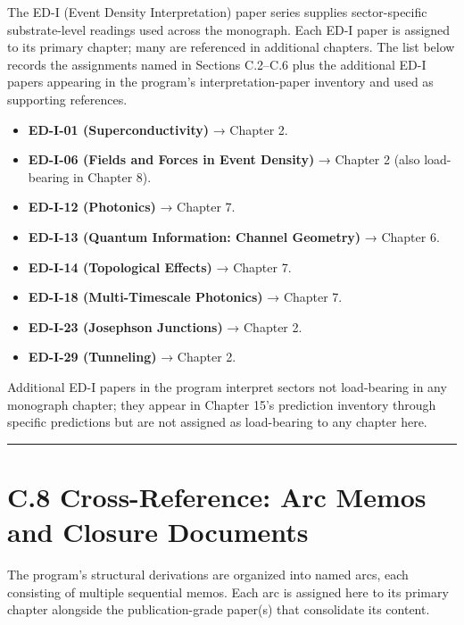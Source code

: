 \documentclass[11pt]{book}
\begin{document}
The ED-I (Event Density Interpretation) paper series supplies sector-specific substrate-level readings used across the monograph. Each ED-I paper is assigned to its primary chapter; many are referenced in additional chapters. The list below records the assignments named in Sections C.2–C.6 plus the additional ED-I papers appearing in the program's interpretation-paper inventory and used as supporting references.

\begin{itemize}
\item \textbf{ED-I-01 (Superconductivity)} → Chapter 2.
\item \textbf{ED-I-06 (Fields and Forces in Event Density)} → Chapter 2 (also load-bearing in Chapter 8).
\item \textbf{ED-I-12 (Photonics)} → Chapter 7.
\item \textbf{ED-I-13 (Quantum Information: Channel Geometry)} → Chapter 6.
\item \textbf{ED-I-14 (Topological Effects)} → Chapter 7.
\item \textbf{ED-I-18 (Multi-Timescale Photonics)} → Chapter 7.
\item \textbf{ED-I-23 (Josephson Junctions)} → Chapter 2.
\item \textbf{ED-I-29 (Tunneling)} → Chapter 2.
\end{itemize}

Additional ED-I papers in the program interpret sectors not load-bearing in any monograph chapter; they appear in Chapter 15's prediction inventory through specific predictions but are not assigned as load-bearing to any chapter here.

\bigskip\hrule\bigskip

\section{C.8 Cross-Reference: Arc Memos and Closure Documents}

The program's structural derivations are organized into named arcs, each consisting of multiple sequential memos. Each arc is assigned here to its primary chapter alongside the publication-grade paper(s) that consolidate its content.
\end{document}
